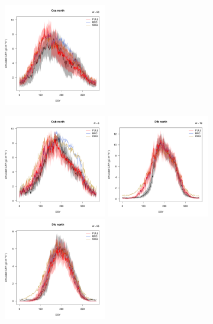 \documentclass{myreport}
\begin{document}
\begin{figure}[!ht]
\includegraphics[width=0.4\textwidth]{fig/meandoy_byzone_Csanorth_all.pdf}
    \caption{}
    \label{fig:modobs_spatialannual}
\end{figure}

 \begin{figure}[!ht]
    \centering
\includegraphics[width=0.4\textwidth]{fig/meandoy_byzone_Csbnorth_all.pdf}
\includegraphics[width=0.4\textwidth]{fig/meandoy_byzone_Dfbnorth_all.pdf}\\
\includegraphics[width=0.4\textwidth]{fig/meandoy_byzone_Dfcnorth_all.pdf}

\end{figure}
\end{document}
